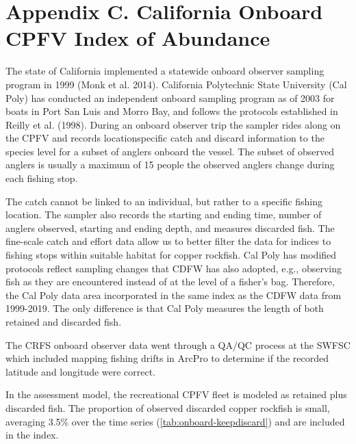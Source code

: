 \documentclass[11pt,
  english,
  letterpaper,
]{article}
\begin{document}
\newcommand{\lt}{\ensuremath <}
\newcommand{\gt}{\ensuremath >}

\linenumbers

\newcommand\CapeM{$40^\circ 10^\prime N$}
\newcommand\PtC{$34^\circ 27^\prime N$}
\newcommand\CAOR{$42^\circ 00^\prime N$}

\hypertarget{onboard-cpfv-index}{%
\section{Appendix C. California Onboard CPFV Index of Abundance}\label{onboard-cpfv-index}}

The state of California implemented a statewide onboard observer sampling program in 1999 (Monk et al. 2014). California Polytechnic State University (Cal Poly) has conducted an independent onboard sampling program as of 2003 for boats in Port San Luis and Morro Bay, and follows the protocols established in Reilly et al. (1998). During an onboard observer trip the sampler rides along on the CPFV and records locationspecific catch and discard information to the species level for a subset of anglers onboard the vessel. The subset of observed anglers is usually a maximum of 15 people the observed anglers change during each fishing stop.

The catch cannot be linked to an individual, but rather to a specific fishing location. The sampler also records the starting and ending time, number of anglers observed, starting and ending depth, and measures discarded fish. The fine-scale catch and effort data allow us to better filter the data for indices to fishing stops within suitable habitat for copper rockfish. Cal Poly has modified protocols reflect sampling changes that CDFW has also adopted, e.g., observing fish as they are encountered instead of at the level of a fisher's bag. Therefore, the Cal Poly data area incorporated in the same index as the CDFW data from 1999-2019. The only difference is that Cal Poly measures the length of both retained and discarded fish.

The CRFS onboard observer data went through a QA/QC process at the SWFSC which included mapping fishing drifts in ArcPro to determine if the recorded latitude and longitude were correct.

In the assessment model, the recreational CPFV fleet is modeled as retained plus discarded fish. The proportion of observed discarded copper rockfish is small, averaging 3.5\% over the time series (\ref{tab:onboard-keepdiscard}) and are included in the index.
\end{document}
